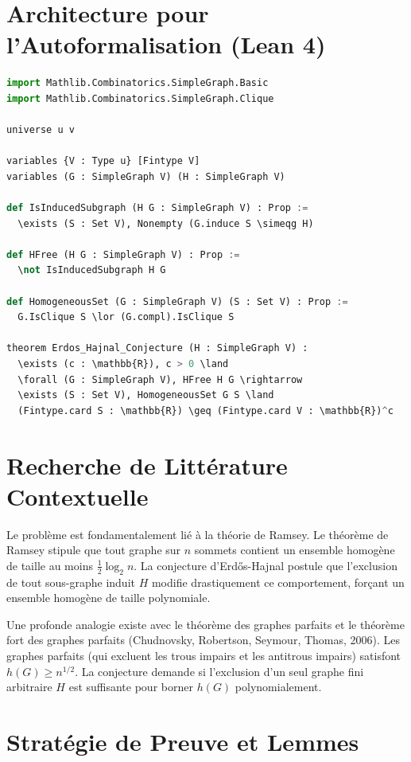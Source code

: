 \documentclass[12pt, a4paper]{article}
\begin{document}
\section{Architecture pour l'Autoformalisation (Lean 4)}

\begin{lstlisting}[language=Python, basicstyle=\ttfamily\small]
import Mathlib.Combinatorics.SimpleGraph.Basic
import Mathlib.Combinatorics.SimpleGraph.Clique

universe u v

variables {V : Type u} [Fintype V]
variables (G : SimpleGraph V) (H : SimpleGraph V)

def IsInducedSubgraph (H G : SimpleGraph V) : Prop :=
  \exists (S : Set V), Nonempty (G.induce S \simeqg H)

def HFree (H G : SimpleGraph V) : Prop :=
  \not IsInducedSubgraph H G

def HomogeneousSet (G : SimpleGraph V) (S : Set V) : Prop :=
  G.IsClique S \lor (G.compl).IsClique S

theorem Erdos_Hajnal_Conjecture (H : SimpleGraph V) :
  \exists (c : \mathbb{R}), c > 0 \land
  \forall (G : SimpleGraph V), HFree H G \rightarrow
  \exists (S : Set V), HomogeneousSet G S \land
  (Fintype.card S : \mathbb{R}) \geq (Fintype.card V : \mathbb{R})^c
\end{lstlisting}

\section{Recherche de Littérature Contextuelle}

Le problème est fondamentalement lié à la théorie de Ramsey. Le théorème de Ramsey stipule que tout graphe sur $n$ sommets contient un ensemble homogène de taille au moins $\frac{1}{2} \log_2 n$. La conjecture d'Erd\H{o}s-Hajnal postule que l'exclusion de tout sous-graphe induit $H$ modifie drastiquement ce comportement, forçant un ensemble homogène de taille polynomiale.

Une profonde analogie existe avec le théorème des graphes parfaits et le théorème fort des graphes parfaits (Chudnovsky, Robertson, Seymour, Thomas, 2006). Les graphes parfaits (qui excluent les trous impairs et les antitrous impairs) satisfont $h(G) \geq n^{1/2}$. La conjecture demande si l'exclusion d'un seul graphe fini arbitraire $H$ est suffisante pour borner $h(G)$ polynomialement.

\section{Stratégie de Preuve et Lemmes}
\end{document}
